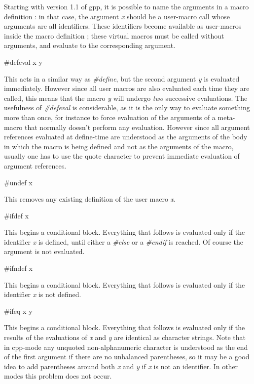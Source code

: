 Starting with version 1.1 of gpp, it is possible to name the arguments in a
macro definition : in that case, the argument {\it x} should be a user-macro
call whose arguments are all identifiers. These identifiers become available
as user-macros inside the macro definition ; these virtual macros must be
called without arguments, and evaluate to the corresponding argument. 

{\bf 

\begin{PRE}
\#defeval x y
\end{PRE}

} This acts in a similar way as {\it \#define}, but the second argument {\it
y} is evaluated immediately. However since all user macros are also evaluated
each time they are called, this means that the macro {\it y} will undergo {\it
two} successive evaluations. The usefulness of {\it \#defeval} is
considerable, as it is the only way to evaluate something more than once, for
instance to force evaluation of the arguments of a meta-macro that normally
doesn't perform any evaluation. However since all argument references
evaluated at define-time are understood as the arguments of the body in which
the macro is being defined and not as the arguments of the macro, usually one
has to use the quote character to prevent immediate evaluation of argument
references. 

{\bf 

\begin{PRE}
\#undef x
\end{PRE}

} This removes any existing definition of the user macro {\it x}. 

{\bf 

\begin{PRE}
\#ifdef x
\end{PRE}

} This begins a conditional block. Everything that follows is evaluated only
if the identifier {\it x} is defined, until either a {\it \#else} or a {\it
\#endif} is reached. Of course the argument is not evaluated. 

{\bf 

\begin{PRE}
\#ifndef x
\end{PRE}

} This begins a conditional block. Everything that follows is evaluated only
if the identifier {\it x} is not defined. 

{\bf 

\begin{PRE}
\#ifeq x y
\end{PRE}

} This begins a conditional block. Everything that follows is evaluated only
if the results of the evaluations of {\it x} and {\it y} are identical as
character strings. Note that in cpp-mode any unquoted non-alphanumeric
character is understood as the end of the first argument if there are no
unbalanced parentheses, so it may be a good idea to add parentheses around
both {\it x} and {\it y} if {\it x} is not an identifier. In other modes this
problem does not occur. 

